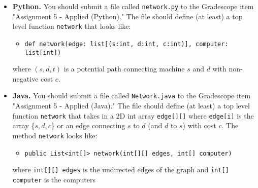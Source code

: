 \documentclass[11pt]{article}
\begin{document}
\begin{itemize}
	\item \textbf{Python.} You should submit a file called \texttt{network.py} to the Gradescope item "Assignment 5 - Applied (Python)." The file should define (at least) a top level function \texttt{network} that looks like: 
	\begin{itemize}
	\item \texttt{def network(edge: list[(s:int, d:int, c:int)], computer: list[int]) }
	\end{itemize}
	where $(s,d,t)$ is a potential path connecting machine $s$ and $d$ with non-negative cost $c$. 
	
    \item \textbf{Java.} You should submit a file called \texttt{Network.java} to the Gradescope item "Assignment 5 - Applied (Java)." The file should define (at least) a top level function \texttt{network} that takes in a 2D int array \texttt{edge[][]} where \texttt{edge[i]} is the array \{$s,d,c$\} or an edge connecting $s$ to $d$ (and $d$ to $s$) with cost $c$. The method \texttt{network} looks like:
    \begin{itemize}
        \item \texttt{public List<int[]> network(int[][] edges, int[] computer)}
    \end{itemize}
    where \texttt{int[][] edges} is the undirected edges of the graph and \texttt{int[] computer} is the computers
    
\end{itemize} 
\end{document}
